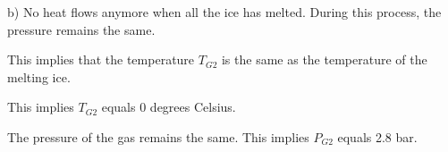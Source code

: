 b) 
No heat flows anymore when all the ice has melted. During this process, the pressure remains the same.

This implies that the temperature \( T_{G2} \) is the same as the temperature of the melting ice.

This implies \( T_{G2} \) equals 0 degrees Celsius.

The pressure of the gas remains the same.
This implies \( P_{G2} \) equals 2.8 bar.